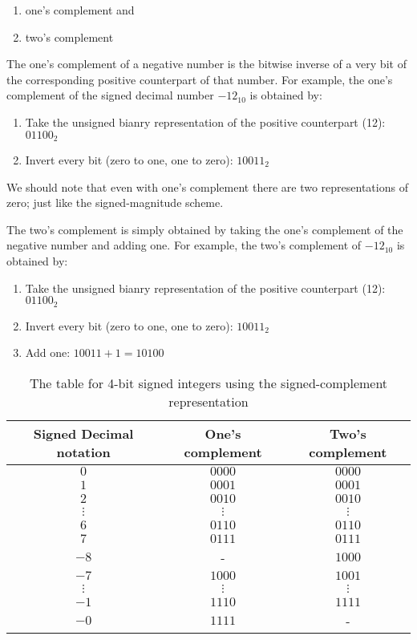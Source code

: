 \begin{enumerate}
    \item one's complement and
    \item two's complement
\end{enumerate}

The one's complement of a negative number is the bitwise
inverse of a very bit of the corresponding positive counterpart
of that number. For example, the one's complement of the signed
decimal number $-12_{10}$ is obtained by:

\begin{enumerate}
    \item Take the unsigned bianry representation of the positive
    counterpart (12): $01100_2$
    \item Invert every bit (zero to one, one to zero): $10011_2$
\end{enumerate}
We should note that even with one's complement there are two
representations of zero; just like the signed-magnitude scheme.

The two's complement is simply obtained by taking the one's
complement of the negative number and adding one. For example,
the two's complement of $-12_{10}$ is obtained by:

\begin{enumerate}
    \item Take the unsigned bianry representation of the positive
    counterpart (12): $01100_2$
    \item Invert every bit (zero to one, one to zero): $10011_2$
    \item Add one: $10011 + 1 = 10100$
\end{enumerate}

\begin{table}[ht]
    \centering
    \begin{tabular}{c|c|c}
        Signed Decimal notation & One's complement & Two's complement \\
        \hline
        $0$      & $0000$   & $0000$ \\
        $1$      & $0001$   & $0001$ \\
        $2$      & $0010$   & $0010$ \\
        $\vdots$ & $\vdots$ & $\vdots$ \\
        $6$      & $0110$   & $0110$ \\
        $7$      & $0111$   & $0111$ \\
        $-8$     & -        & $1000$ \\
        $-7$     & $1000$   & $1001$ \\
        $\vdots$ & $\vdots$ & $\vdots$ \\
        $-1$     & $1110$   & $1111$ \\
        $-0$     & $1111$   & - \\
    \end{tabular}
    \caption{The table for 4-bit signed integers using the signed-complement representation}
\end{table}

